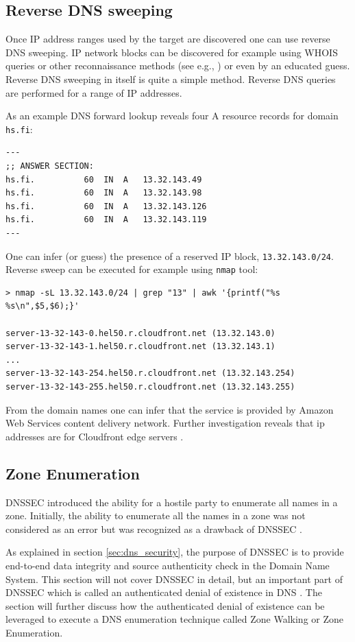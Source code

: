 \subsection{Reverse DNS sweeping}

Once IP address ranges used by the target are discovered one can use reverse DNS sweeping. IP network blocks can be discovered for example using WHOIS queries or other reconnaissance methods (see e.g., \cite{network_sec_assessment}) or even by an educated guess. Reverse DNS sweeping in itself is quite a simple method. Reverse DNS queries are performed for a range of IP addresses. 

As an example DNS forward lookup reveals four A resource records for domain \texttt{hs.fi}:
\begin{verbatim}
---
;; ANSWER SECTION:
hs.fi.			60	IN	A	13.32.143.49
hs.fi.			60	IN	A	13.32.143.98
hs.fi.			60	IN	A	13.32.143.126
hs.fi.			60	IN	A	13.32.143.119
---
\end{verbatim}
One can infer (or guess) the presence of a reserved IP block, \texttt{13.32.143.0/24}. Reverse sweep can be executed for example using \texttt{nmap} tool:
\begin{verbatim}
> nmap -sL 13.32.143.0/24 | grep "13" | awk '{printf("%s %s\n",$5,$6);}'

server-13-32-143-0.hel50.r.cloudfront.net (13.32.143.0)
server-13-32-143-1.hel50.r.cloudfront.net (13.32.143.1)
...
server-13-32-143-254.hel50.r.cloudfront.net (13.32.143.254)
server-13-32-143-255.hel50.r.cloudfront.net (13.32.143.255)
\end{verbatim}

From the domain names one can infer that the service is provided by Amazon Web Services content delivery network. Further investigation reveals that ip addresses are for Cloudfront edge servers \cite{AWS}.

\subsection{Zone Enumeration}

DNSSEC introduced the ability for a hostile party to enumerate all names in a zone. Initially, the ability to enumerate all the names in a zone was not considered as an error but was recognized as a drawback of DNSSEC \cite{RFC_4033}.

As explained in section \ref{sec:dns_security}, the purpose of DNSSEC is to provide end-to-end data integrity and source authenticity check in the Domain Name System. This section will not cover DNSSEC in detail, but an important part of DNSSEC which is called an authenticated denial of existence in DNS  \cite{RFC_7129}. The section will further discuss how the authenticated denial of existence can be leveraged to execute a DNS enumeration technique called Zone Walking or Zone Enumeration.


